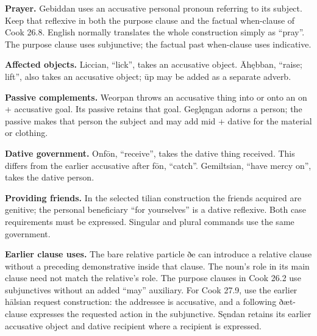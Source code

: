 \textbf{Prayer.} Gebiddan uses an accusative personal pronoun referring to its subject. Keep that reflexive in both the purpose clause and the factual when-clause of Cook 26.8. English normally translates the whole construction simply as “pray”. The purpose clause uses subjunctive; the factual past when-clause uses indicative.

\textbf{Affected objects.} Liccian, “lick”, takes an accusative object. Āhębban, “raise; lift”, also takes an accusative object; ūp may be added as a separate adverb.

\textbf{Passive complements.} Weorpan throws an accusative thing into or onto an on + accusative goal. Its passive retains that goal. Geglęngan adorns a person; the passive makes that person the subject and may add mid + dative for the material or clothing.

\textbf{Dative government.} Onfōn, “receive”, takes the dative thing received. This differs from the earlier accusative after fōn, “catch”. Gemiltsian, “have mercy on”, takes the dative person.

\textbf{Providing friends.} In the selected tilian construction the friends acquired are genitive; the personal beneficiary “for yourselves” is a dative reflexive. Both case requirements must be expressed. Singular and plural commands use the same government.

\textbf{Earlier clause uses.} The bare relative particle ðe can introduce a relative clause without a preceding demonstrative inside that clause. The noun’s role in its main clause need not match the relative’s role. The purpose clauses in Cook 26.2 use subjunctives without an added “may” auxiliary. For Cook 27.9, use the earlier hālsian request construction: the addressee is accusative, and a following ðæt-clause expresses the requested action in the subjunctive. Sęndan retains its earlier accusative object and dative recipient where a recipient is expressed.

